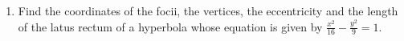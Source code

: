 \begin{enumerate}[label=\thesection.\arabic*,ref=\thesection.\theenumi]

	\item Find the coordinates of the focii, the vertices, the eccentricity and the length of the latus rectum of a hyperbola whose equation is given by $\frac{x^2}{16}-\frac{y^2}{9} = 1$. \\ 
		\solution
		

\end{enumerate}
